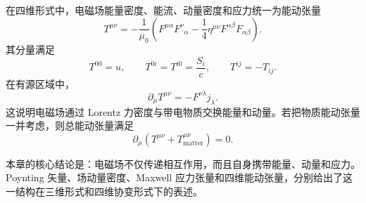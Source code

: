 在四维形式中，电磁场能量密度、能流、动量密度和应力统一为能动张量
\[
T^{\mu\nu}
=
-\frac{1}{\mu_{0}}
\left(
F^{\mu\alpha}F^{\nu}{}_{\alpha}
-
\frac{1}{4}\eta^{\mu\nu}
F^{\alpha\beta}F_{\alpha\beta}
\right).
\]
其分量满足
\[
T^{00}=u,
\qquad
T^{0i}=T^{i0}=\frac{S_{i}}{c},
\qquad
T^{ij}=-T_{ij}.
\]
在有源区域中，
\[
\partial_{\mu}T^{\mu\nu}
=
-F^{\nu\lambda}j_{\lambda}.
\]
这说明电磁场通过 Lorentz 力密度与带电物质交换能量和动量。若把物质能动张量一并考虑，则总能动张量满足
\[
\partial_{\mu}
\left(
T^{\mu\nu}
+
T_{\mathrm{matter}}^{\mu\nu}
\right)
=
0.
\]

本章的核心结论是：电磁场不仅传递相互作用，而且自身携带能量、动量和应力。Poynting 矢量、场动量密度、Maxwell 应力张量和四维能动张量，分别给出了这一结构在三维形式和四维协变形式下的表述。
